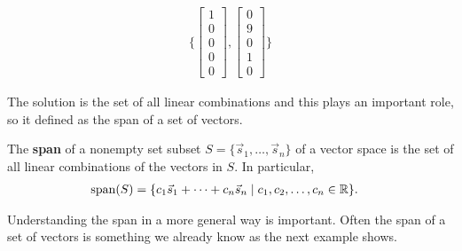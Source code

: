 \begin{align*} \{
\begin{bmatrix} 
1 \\ 0 \\ 0 \\ 0 \\0
\end{bmatrix},  
\begin{bmatrix}
0 \\ 9 \\ 0 \\ 1 \\ 0
\end{bmatrix}  \}
\end{align*}

The solution is the set of all linear combinations and this plays an important role, so it defined as the span of a set of vectors.  



\begin{definition}
The \textbf{span} of a nonempty set subset $S=\{\vec{s}_1,\ldots, \vec{s}_n\}$ of a vector space is the set of all linear combinations of the vectors in $S$.   In particular,
%
\begin{align*}
\operatorname{span}(S) & = \{ c_1 \vec{s}_1  + \cdots + c_n \vec{s}_n\; | \; \text{$c_1, c_2, \ldots, c_n \in \mathbb{R}$} \}.  
\end{align*}
\end{definition}

Understanding the span in a more general way is important.  Often the span of a set of vectors is something we already know as the next example shows. 

